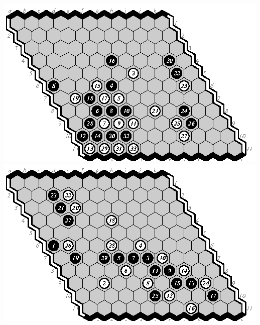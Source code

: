 \documentclass{icga}
\begin{document}
\includegraphics[scale=1.3]{9m-d.eps}\hspace*{-1cm}\includegraphics[scale=1.3]{10m-e.eps}
\end{document}
